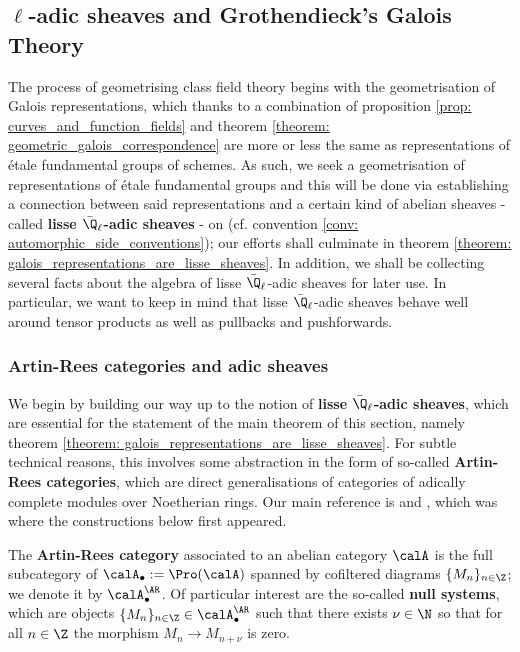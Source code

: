     \subsection{\texorpdfstring{$\ell$}{}-adic sheaves and Grothendieck's Galois Theory}
        The process of geometrising class field theory begins with the geometrisation of Galois representations, which thanks to a combination of proposition \ref{prop: curves_and_function_fields} and theorem \ref{theorem: geometric_galois_correspondence} are more or less the same as representations of \'etale fundamental groups of schemes. As such, we seek a geometrisation of representations of \'etale fundamental groups and this will be done via establishing a connection between said representations and a certain kind of abelian sheaves - called \textbf{lisse $\bar{\Q}_{\ell}$-adic sheaves} - on  (cf. convention \ref{conv: automorphic_side_conventions}); our efforts shall culminate in theorem \ref{theorem: galois_representations_are_lisse_sheaves}. In addition, we shall be collecting several facts about the algebra of lisse $\bar{\Q}_{\ell}$-adic sheaves for later use. In particular, we want to keep in mind that lisse $\bar{\Q}_{\ell}$-adic sheaves behave well around tensor products as well as pullbacks and pushforwards.  
    
        \subsubsection{Artin-Rees categories and adic sheaves}
            We begin by building our way up to the notion of \textbf{lisse $\bar{\Q}_{\ell}$-adic sheaves}, which are essential for the statement of the main theorem of this section, namely theorem \ref{theorem: galois_representations_are_lisse_sheaves}. For subtle technical reasons, this involves some abstraction in the form of so-called \textbf{Artin-Rees categories}, which are direct generalisations of categories of adically complete modules over Noetherian rings. Our main reference is \cite[Subsection 1.4]{conrad_etale_cohomology} and \cite[Expos\'e V]{sga5}, which was where the constructions below first appeared.
        
            \begin{definition} \label{def: artin_rees_categories}
                The \textbf{Artin-Rees category} associated to an abelian category $\calA$ is the full subcategory of $\calA_{\bullet} := \Pro(\calA)$ spanned by cofiltered diagrams $\{M_n\}_{n \in \Z}$; we denote it by $\calA_{\bullet}^{\AR}$. Of particular interest are the so-called \textbf{null systems}, which are objects $\{M_n\}_{n \in \Z} \in \calA_{\bullet}^{\AR}$ such that there exists $\nu \in \N$ so that for all $n \in \Z$ the morphism $M_n \to M_{n + \nu}$ is zero.
            \end{definition}
            
